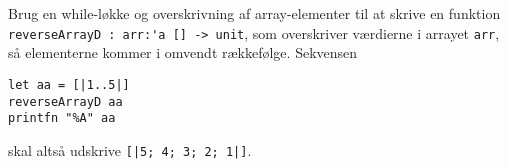 Brug en while-løkke og overskrivning af array-elementer til at skrive
en funktion \lstinline{reverseArrayD : arr:'a [] -> unit}, som
overskriver værdierne i arrayet \lstinline{arr}, så elementerne kommer
i omvendt rækkefølge.  Sekvensen
\begin{verbatim}
let aa = [|1..5|]
reverseArrayD aa
printfn "%A" aa
\end{verbatim}
skal altså udskrive \lstinline{[|5; 4; 3; 2; 1|]}.

